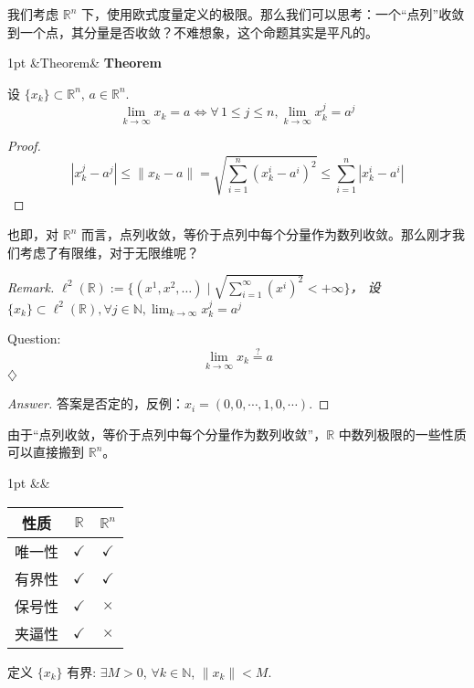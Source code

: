 \documentclass[a4paper]{article}
\newenvironment{formal}[1][]{%
\def\FrameCommand{%
\hspace{1pt}%
{\color{formalline}\vrule width 2pt}%
{\color{formalshade}\vrule width 4pt}%
\colorbox{formalshade}%
}%
\MakeFramed{\advance\hsize-\width\FrameRestore}%
\noindent
\hspace{-4.55pt}%
\begin{adjustwidth}{}{1pt}%
\setlength{\parindent}{0pt}%
\vspace{3pt}%
\ifx&#1&\else %
\textbf{#1}\par
\vspace{1pt}%
\fi }{%
\vspace{2pt}%
\end{adjustwidth}\endMakeFramed%
}
\newenvironment{theorem}[1][]{%
\def\FrameCommand{%
\hspace{1pt}%
{\color{theoremline}\vrule width 2pt}%
{\color{theoremshade}\vrule width 4pt}%
\colorbox{theoremshade}%
}%
\MakeFramed{\advance\hsize-\width\FrameRestore}%
\noindent
\hspace{-4.55pt}%
\begin{adjustwidth}{}{1pt}%
\setlength{\parindent}{0pt}%
\vspace{3pt}%
\ifx&#1&\else %
\textbf{#1}\par
\vspace{1pt}%
\fi }{%
\vspace{2pt}%
\end{adjustwidth}\endMakeFramed%
}
\newenvironment{remark}{%
\par
\smallskip
\noindent
\itshape Remark. }{%
\smallskip
\hfill$\diamondsuit$ \par}
\begin{document}
    我们考虑 $\mathbb{R}^{n}$
    下，使用欧式度量定义的极限。那么我们可以思考：一个“点列”收敛到一个点，其分量是否收敛？不难想象，这个命题其实是平凡的。

    \begin{theorem}[Theorem]
        设 $\{x_{k}\} \subset \mathbb{R}^{n}$, $a \in \mathbb{R}^{n}$.
        \[
            \lim_{k \to \infty}x_{k}= a \iff \forall \, 1 \leq j \leq n, \lim_{k
            \to \infty}x_{k}^{j}= a^{j}
        \]
    \end{theorem}

    \begin{proof}[Proof]
        \[
            |x_{k}^{j}- a^{j}| \leq \|x_{k}- a\| = \sqrt{\sum_{i=1}^{n}(x_{k}^{i}-
            a^{i})^{2}}\leq \sum_{i=1}^{n}|x_{k}^{i}- a^{i}|
        \]
    \end{proof}

    也即，对 $\mathbb{R}^{n}$ 而言，点列收敛，等价于点列中每个分量作为数列收敛。那么刚才我们考虑了有限维，对于无限维呢？

    \begin{remark}
        $\ell^{2}(\mathbb{R}) := \{(x^{1}, x^{2}, \dots) \mid \sqrt{\sum_{i=1}^{\infty}(x^{i})^{2}}
        < +\infty\}$， 设 $\{x_{k}\} \subset \ell^{2}(\mathbb{R}), \forall j \in \mathbb{N}, \lim_{k \to \infty}x_{k}^{j}= a^{j}$

        Question:
        \[
            \lim_{k \to \infty}x_{k}\overset{?}{=}a
        \]
    \end{remark}

    \begin{proof}[Answer]
        答案是否定的，反例：$x_{i}= (0,0,\cdots,1,0,\cdots)$.
    \end{proof}

    由于“点列收敛，等价于点列中每个分量作为数列收敛”，$\mathbb{R}$ 中数列极限的一些性质可以直接搬到
    $\mathbb{R}^{n}$。

    \begin{formal}
        \begin{center}
            \begin{tabular}{c c c}
                \hline
                性质  & $\mathbb{R}$ & $\mathbb{R}^{n}$ \\
                \hline
                唯一性 & $\checkmark$ & $\checkmark$     \\
                有界性 & $\checkmark$ & $\checkmark$     \\
                保号性 & $\checkmark$ & $\times$         \\
                夹逼性 & $\checkmark$ & $\times$         \\
                \hline
            \end{tabular}
        \end{center}

        \bigskip

        定义 $\{x_{k}\}$ 有界: $\exists M > 0$, $\forall k \in \mathbb{N}$,
        $\|x_{k}\| < M$.
    \end{formal}
\end{document}
